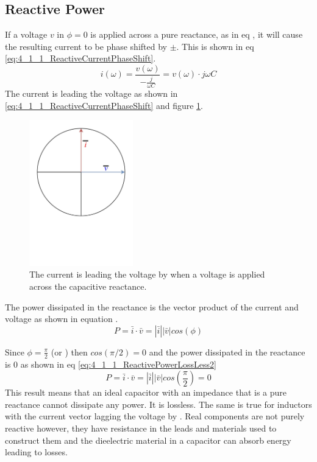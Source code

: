 \subsection{Reactive Power} \label{subsec:ReactivePower}
If a voltage $v$ in $\phi = 0$ is applied across a pure reactance, as in eq , it will cause the resulting current to be phase shifted by $\pm$. This is shown in eq \ref{eq:4_1_1_ReactiveCurrentPhaseShift}. 
\begin{equation}\label{eq:4_1_1_ReactiveCurrentPhaseShift}
    i(\omega) = \frac{v(\omega)}{-\frac{j}{\omega C}} = v(\omega) \cdot j \omega C 
\end{equation}
The current is leading the voltage as shown in \ref{eq:4_1_1_ReactiveCurrentPhaseShift} and figure \ref{fig:4_1_1_ReactanceCurrentLeadVoltage}.
\begin{figure}[H]
    \centering
    \includegraphics[clip, trim=0 250 0 0, width=0.4\textwidth]{Sections/4_TechnicalAnalysis/Figures/4_1_1_ReactanceCurrentPhase.pdf}
    \caption{The current is leading the voltage by  when a voltage is applied across the capacitive reactance.}
    \label{fig:4_1_1_ReactanceCurrentLeadVoltage}
\end{figure}

The power dissipated in the reactance is the vector product of the current and voltage as shown in equation .
\begin{equation}\label{eq:4_1_1_ReactivePowerLossLess}
    P = \bar i \cdot \bar v = |\bar i| |\bar v| cos(\phi)
\end{equation}

Since $\phi = \frac{\pi}{2}$ (or ) then $cos(\pi/2) = 0$ and the power dissipated in the reactance is 0 as shown in eq \ref{eq:4_1_1_ReactivePowerLossLess2}
\begin{equation}\label{eq:4_1_1_ReactivePowerLossLess2}
    P = \bar i \cdot \bar v = |\bar i| |\bar v| cos\left(\frac{\pi}{2}\right) = 0
\end{equation}
This result means that an ideal capacitor with an impedance that is a pure reactance cannot dissipate any power. It is lossless. The same is true for inductors with the current vector lagging the voltage by . Real components are not purely reactive however, they have resistance in the leads and materials used to construct them and the dieelectric material in a capacitor can absorb energy leading to losses. 
